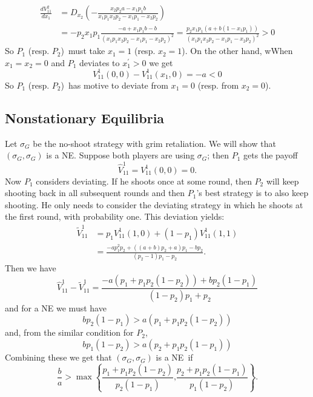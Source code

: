 \documentclass{article}%
\numberwithin{equation}{section}
\begin{document}
\begin{align*}
\frac{dV_{11}^{2}}{dx_{1}}  &  =D_{x_{2}}\left(  -\frac{x_{2}p_{2}a-x_{1}%
p_{1}b}{x_{1}p_{1}x_{2}p_{2}-x_{1}p_{1}-x_{2}p_{2}}\right) \\
&  =\allowbreak-p_{2}x_{1}p_{1}\frac{-a+x_{1}p_{1}b-b}{\left(  x_{1}p_{1}%
x_{2}p_{2}-x_{1}p_{1}-x_{2}p_{2}\right)  ^{2}}=\frac{p_{2}x_{1}p_{1}\left(
a+b\left(  1-x_{1}p_{1}\right)  \right)  }{\left(  x_{1}p_{1}x_{2}p_{2}%
-x_{1}p_{1}-x_{2}p_{2}\right)  ^{2}}>0
\end{align*}
So $P_{1}$ (resp. $P_{2}$)\ must take $x_{1}=1$ (resp. $x_{2}=1$). On the
other hand, wWhen $x_{1}=x_{2}=0$ and $P_{1}$ deviates to $x_{1}^{\prime}>0$
we get%
\[
V_{11}^{1}\left(  0,0\right)  -V_{11}^{1}\left(  x_{1},0\right)  =-a<0
\]
So $P_{1}$ (resp. $P_{2}$)\ has motive to deviate from $x_{1}=0$ (resp. from
$x_{2}=0$).

\subsection{Nonstationary Equilibria}

Let $\sigma_{G}$ be the no-shoot strategy with grim retaliation. We will show
that $\left(  \sigma_{G},\sigma_{G}\right)  $ is a NE. Suppose both players
are using $\sigma_{G}$; then $P_{1}$ gets the payoff
\[
\widehat{V}_{11}^{1}=V_{11}^{1}\left(  0,0\right)  =0.
\]
Now $P_{1}$ considers deviating. If he shoots once at some round, then $P_{2}$
will keep shooting back in all subsequent rounds and then $P_{1}$'s best
strategy is to also keep shooting. He only needs to consider the deviating
strategy in which he shoots at the first round, with probability one. This
deviation yields:
\begin{align*}
\widetilde{V}_{11}^{1}  &  =p_{1}V_{11}^{1}\left(  1,0\right)  +\left(
1-p_{1}\right)  V_{11}^{1}\left(  1,1\right) \\
&  =\frac{-ap_{1}^{2}p_{2}+\left(  (a+b)p_{2}+a\right)  p_{1}-bp_{2}}%
{(p_{2}-1)p_{1}-p_{2}}.
\end{align*}
Then we have%
\[
\widehat{V}_{11}^{1}-\widetilde{V}_{11}^{1}=\frac{-a\left(  p_{1}+p_{1}%
p_{2}\left(  1-p_{2}\right)  \right)  +bp_{2}\left(  1-p_{1}\right)
}{(1-p_{2})p_{1}+p_{2}}%
\]
and for a NE we must have
\[
bp_{2}\left(  1-p_{1}\right)  >a\left(  p_{1}+p_{1}p_{2}\left(  1-p_{2}%
\right)  \right)
\]
and, from the similar condition for $P_{2}$,%
\[
bp_{1}\left(  1-p_{2}\right)  >a\left(  p_{2}+p_{1}p_{2}\left(  1-p_{1}%
\right)  \right)
\]
Combining these we get that $\left(  \sigma_{G},\sigma_{G}\right)  $ is a
NE\ if%
\[
\frac{b}{a}>\max\left\{  \frac{p_{1}+p_{1}p_{2}\left(  1-p_{2}\right)  }%
{p_{2}\left(  1-p_{1}\right)  }\text{,}\frac{p_{2}+p_{1}p_{2}\left(
1-p_{1}\right)  }{p_{1}\left(  1-p_{2}\right)  }\right\}  .
\]
\end{document}
